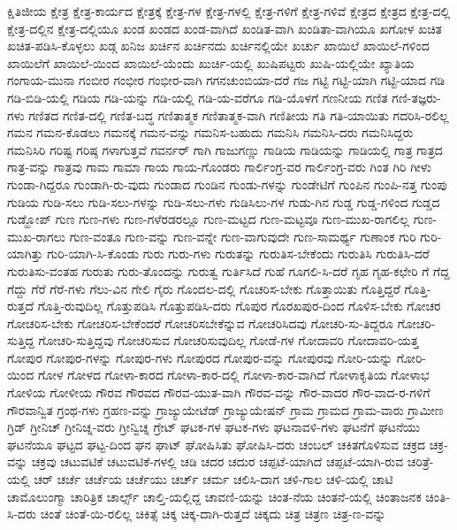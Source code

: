 {ಕ್ಷಿತಿಜೀಯ
ಕ್ಷೇತ್ರ
ಕ್ಷೇತ್ರ-ಕಾರ್ಯದ
ಕ್ಷೇತ್ರಕ್ಕೆ
ಕ್ಷೇತ್ರ-ಗಳ
ಕ್ಷೇತ್ರ-ಗಳಲ್ಲಿ
ಕ್ಷೇತ್ರ-ಗಳಿಗೆ
ಕ್ಷೇತ್ರ-ಗಳಿವೆ
ಕ್ಷೇತ್ರದ
ಕ್ಷೇತ್ರದ
ಕ್ಷೇತ್ರ-ದಲ್ಲಿ
ಕ್ಷೇತ್ರ-ದಲ್ಲಿನ
ಕ್ಷೇತ್ರ-ದಲ್ಲಿಯೂ
ಖಂಡ
ಖಂಡದ
ಖಂಡ-ವಾಗಿದೆ
ಖಂಡಿತ-ವಾಗಿ
ಖಂಡಿತಾ-ವಾಗಿಯೂ
ಖಗೋಳ
ಖಚಿತ
ಖಚಿತ-ಪಡಿಸಿ-ಕೊಳ್ಳಲು
ಖಡ್ಗ
ಖನಿಜ
ಖರ್ಚಿನ
ಖರ್ಚಿನದು
ಖರ್ಚಿನಲ್ಲಿಯೇ
ಖರ್ಚು
ಖಾಯಿಲೆ
ಖಾಯಿಲೆ-ಗಳಿಂದ
ಖಾಯಿಲೆಗೆ
ಖಾಯಿಲೆ-ಯಿಂದ
ಖಾಯಿಲೆ-ಯೆಂದು
ಖುರ್ಚಿ-ಯಲ್ಲಿ
ಖುಷಿಪಟ್ಟರು
ಖುಷಿ-ಯಲ್ಲಿಯೇ
ಖ್ಯಾತಿಯ
ಗಂಗಾಯ-ಮುನಾ
ಗಂಬೀರ
ಗಂಭೀರ
ಗಂಭೀರ-ವಾಗಿ
ಗಗನಚುಂಬಿಯಾ-ದರೆ
ಗಜ
ಗಟ್ಟಿ
ಗಟ್ಟಿ-ಯಾಗಿ
ಗಟ್ಟಿ-ಯಾದ
ಗಡಿ
ಗಡಿ-ಬಿಡಿ-ಯಲ್ಲಿ
ಗಡಿಯ
ಗಡಿ-ಯನ್ನು
ಗಡಿ-ಯಲ್ಲಿ
ಗಡಿ-ಯ-ವರೆಗೂ
ಗಡಿ-ಯೊಳಗೆ
ಗಣನೀಯ
ಗಣಿತ
ಗಣಿ-ತಜ್ಞರು-ಗಳು
ಗಣಿತದ
ಗಣಿತ-ದಲ್ಲಿ
ಗಣಿತ-ಬದ್ಧ
ಗಣಿತಾತ್ಮಕ
ಗಣಿತಾತ್ಮಕ-ವಾಗಿ
ಗಣಿತೀಯ
ಗತಿ
ಗತಿ-ಯಾಯಿತು
ಗದರಿಸಿ-ರಲಿಲ್ಲ
ಗಮನ
ಗಮನ-ಕೊಡಲು
ಗಮನಕ್ಕೆ
ಗಮನ-ವನ್ನು
ಗಮನಿಸ-ಬಹುದು
ಗಮನಿಸಿ
ಗಮನಿಸಿ-ದರು
ಗಮನಿಸಿದ್ದರು
ಗಮನಿಸಿರಿ
ಗರಿಷ್ಟ
ಗರಿಷ್ಠ
ಗಳಾಗುತ್ತವೆ
ಗವರ್ನರ್
ಗಾಗಿ
ಗಾಜುಗಣ್ಣು
ಗಾಡಿಯ
ಗಾಡಿಯನ್ನು
ಗಾಡಿಯಲ್ಲಿ
ಗಾತ್ರ
ಗಾತ್ರದ
ಗಾತ್ರ-ವನ್ನು
ಗಾತ್ರವು
ಗಾಮ
ಗಾಮಾ
ಗಾಯ
ಗಾಯ-ಗೊಂಡರು
ಗಾರ್ಲಿಂಗ್ರ-ವರ
ಗಾರ್ಲಿಂಗ್ರ-ವರು
ಗಿಂತ
ಗಿರಿ
ಗೀಳು
ಗುಂಡಾ-ಗಿದ್ದರೂ
ಗುಂಡಾಗಿ-ರು-ವುದು
ಗುಂಡಾದ
ಗುಂಡಿನ
ಗುಂಡು-ಗಳನ್ನು
ಗುಂಡೇಟಿಗೆ
ಗುಂಪಿನ
ಗುಂಪಿ-ನತ್ತ
ಗುಂಪು
ಗುಡಿಯ
ಗುಡಿ-ಸಲು
ಗುಡಿ-ಸಲು-ಗಳನ್ನು
ಗುಡಿ-ಸಲು-ಗಳು
ಗುಡಿಸಿಲು-ಗಳ
ಗುಡು-ಗಿನ
ಗುಡ್ಡ
ಗುಡ್ಡ-ಗಳಿಂದ
ಗುಡ್ಡದ
ಗುಡ್ಹೋಪ್
ಗುಣ
ಗುಣ-ಗಳು
ಗುಣ-ಗಳೆರಡರಲ್ಲೂ
ಗುಣ-ಮಟ್ಟದ
ಗುಣ-ಮಟ್ಟವೂ
ಗುಣ-ಮುಖ-ರಾಗಲಿಲ್ಲ
ಗುಣ-ಮುಖ-ರಾಗಲು
ಗುಣ-ವಂತೂ
ಗುಣ-ವನ್ನು
ಗುಣ-ವನ್ನೇ
ಗುಣ-ವಾಗುವುದೇ
ಗುಣ-ಸಾಮರ್ಥ್ಯ
ಗುಣಾಂಕ
ಗುರಿ
ಗುರಿ-ಯಾಗಿತ್ತು
ಗುರಿ-ಯಾಗಿ-ಸಿ-ಕೊಂಡು
ಗುರು
ಗುರು-ಗಳು
ಗುರುತನ್ನು
ಗುರುತಿಸ-ಬೇಕೆಂದು
ಗುರುತಿಸಿ
ಗುರುತಿಸಿ-ದರೆ
ಗುರುತಿಸು-ವಂತಹ
ಗುರುತು
ಗುರು-ತೊಂದನ್ನು
ಗುರುತ್ವ
ಗುರ್ತಿಸಿದೆ
ಗುಹೆ
ಗೂಗಲಿ-ಸಿ-ದರೆ
ಗೃಹ
ಗೃಹ-ಕಛೇರಿ
ಗೆ
ಗೆದ್ದ
ಗೆದ್ದು
ಗೆರೆ
ಗೆರೆ-ಗಳು
ಗೆಲು-ವಿನ
ಗೇಲಿ
ಗೈರು
ಗೊಂದಲ-ದಲ್ಲಿ
ಗೊಚರಿಸ-ಬೇಕು
ಗೊತ್ತಾಯಿತು
ಗೊತ್ತಿದ್ದರೆ
ಗೊತ್ತಿ-ರುತ್ತದೆ
ಗೊತ್ತಿ-ರುವುದಿಲ್ಲ
ಗೊತ್ತುಪಡಿಸಿ
ಗೊತ್ತುಪಡಿಸಿ-ದರು
ಗೊಪುರ
ಗೊರಖಪುರ-ದಿಂದ
ಗೊಳಿಸ-ಬೇಕು
ಗೋಚರ
ಗೋಚರಿಸ-ಬೇಕು
ಗೋಚರಿಸ-ಬೇಕೆಂದರೆ
ಗೋಚರಿಸಬೇಕೆನ್ನುವ
ಗೋಚರಿಸಿದವು
ಗೋಚರಿ-ಸು-ತಿದ್ದರೂ
ಗೋಚರಿ-ಸುತ್ತಿದ್ದ
ಗೋಚರಿ-ಸುತ್ತಿದ್ದವು
ಗೋಚರಿಸುವ
ಗೋಚರಿಸುವುದಿಲ್ಲ
ಗೋಡೆ-ಗಳ
ಗೋದಾವರಿ
ಗೋದಾವರಿ-ಯತ್ತ
ಗೋಪುರ
ಗೋಪುರ-ಗಳನ್ನು
ಗೋಪುರ-ಗಳು
ಗೋಪುರದ
ಗೋಪುರ-ವನ್ನು
ಗೋಪುರವು
ಗೋರಿ-ಯನ್ನು
ಗೋರಿ-ಯಿಂದ
ಗೋಳ
ಗೋಳದ
ಗೋಳಾ-ಕಾರದ
ಗೋಳಾ-ಕಾರ-ದಲ್ಲಿ
ಗೋಳಾ-ಕಾರ-ವಾಗಿದೆ
ಗೋಳಾಕೃತಿಯ
ಗೋಳಾಭ
ಗೋಳಿಯ
ಗೋಳೀಯ
ಗೌರವ
ಗೌರವದ
ಗೌರವ-ಯುತ-ವಾಗಿ
ಗೌರವ-ವನ್ನು
ಗೌರ-ವಾದರ
ಗೌರ-ವಾದ-ರ-ಗಳಿಗೆ
ಗೌರವಾನ್ವಿತ
ಗ್ರಂಥ-ಗಳು
ಗ್ರಹಣ-ವನ್ನು
ಗ್ರಾಜ್ಯುಯೇಟೆಡ್
ಗ್ರಾಜ್ಯುಯೇಷನ್
ಗ್ರಾಮ
ಗ್ರಾಮದ
ಗ್ರಾಮ-ವಾರು
ಗ್ರಾಮೀಣ
ಗ್ರಿಡ್
ಗ್ರೀನಿಚ್
ಗ್ರೀನಿಚ್ನ-ವರು
ಗ್ರೀನ್ವಿಚ್ನ
ಗ್ರೇಟ್
ಘಟಕ-ಗಳ
ಘಟಕ-ಗಳು
ಘಟನಾವಳಿ-ಗಳು
ಘಟನೆಗೆ
ಘಟನೆಯು
ಘಟನೆಯೂ
ಘಟ್ಟದ
ಘಟ್ಟ-ದಿಂದ
ಘನ
ಘಾಟ್
ಘೋಷಿಸಿತು
ಘೋಷಿಸಿ-ದರು
ಚಂಬಲ್
ಚಕಿತಗೊಳಿಸುವ
ಚಕ್ರದ
ಚಕ್ರ-ವನ್ನು
ಚಕ್ರವು
ಚಟುವಟಿಕೆ
ಚಟುವಟಿಕೆ-ಗಳಲ್ಲಿ
ಚಡಿ
ಚದರ
ಚದುರ
ಚಪ್ಪಟೆ-ಯಾಗಿದೆ
ಚಪ್ಪಟೆ-ಯಾಗಿ-ರುವ
ಚರಿತ್ರೆ-ಯಲ್ಲಿ
ಚರ್
ಚರ್ಚೆ
ಚರ್ಚೆಯ
ಚರ್ಚೆಯು
ಚರ್ಚ್
ಚರ್ಮ
ಚಲಿಸಿ-ದಾಗ
ಚಳಿ-ಗಾಲ
ಚಳಿ-ಯಲ್ಲಿ
ಚಾಟಿ
ಚಾಮೊಲುಂಗ್ಮಾ
ಚಾರಿತ್ರಿಕ
ಚಾರ್ಲ್ಸ್
ಚಾಲ್ತಿ-ಯಲ್ಲಿದ್ದ
ಚಾವಣಿ-ಯನ್ನು
ಚಿಂತ-ನೆಯ
ಚಿಂತನೆ-ಯಲ್ಲಿ
ಚಿಂತಾಜನಕ
ಚಿಂತಿ-ಸಿ-ದರು
ಚಿಂತೆ
ಚಿಂತೆ-ಯಿ-ರಲಿಲ್ಲ
ಚಿಕಿತ್ಸೆ
ಚಿಕ್ಕ
ಚಿಕ್ಕ-ದಾಗಿ-ರುತ್ತದೆ
ಚಿಕ್ಕದು
ಚಿತ್ರ
ಚಿತ್ರಣ
ಚಿತ್ರ-ಣ-ವನ್ನು
}
